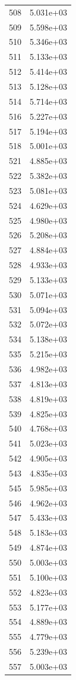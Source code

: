 \documentclass[12pt]{article}
\begin{document}
\begin{longtable}{@{}cc@{}}
508 & 5.031e+03 \\
509 & 5.598e+03 \\
510 & 5.346e+03 \\
511 & 5.133e+03 \\
512 & 5.414e+03 \\
513 & 5.128e+03 \\
514 & 5.714e+03 \\
516 & 5.227e+03 \\
517 & 5.194e+03 \\
518 & 5.001e+03 \\
521 & 4.885e+03 \\
522 & 5.382e+03 \\
523 & 5.081e+03 \\
524 & 4.629e+03 \\
525 & 4.980e+03 \\
526 & 5.208e+03 \\
527 & 4.884e+03 \\
528 & 4.933e+03 \\
529 & 5.133e+03 \\
530 & 5.071e+03 \\
531 & 5.094e+03 \\
532 & 5.072e+03 \\
534 & 5.138e+03 \\
535 & 5.215e+03 \\
536 & 4.982e+03 \\
537 & 4.813e+03 \\
538 & 4.819e+03 \\
539 & 4.825e+03 \\
540 & 4.768e+03 \\
541 & 5.023e+03 \\
542 & 4.905e+03 \\
543 & 4.835e+03 \\
545 & 5.985e+03 \\
546 & 4.962e+03 \\
547 & 5.433e+03 \\
548 & 5.183e+03 \\
549 & 4.874e+03 \\
550 & 5.003e+03 \\
551 & 5.100e+03 \\
552 & 4.823e+03 \\
553 & 5.177e+03 \\
554 & 4.889e+03 \\
555 & 4.779e+03 \\
556 & 5.239e+03 \\
557 & 5.003e+03 \\

\end{longtable}
\end{document}
